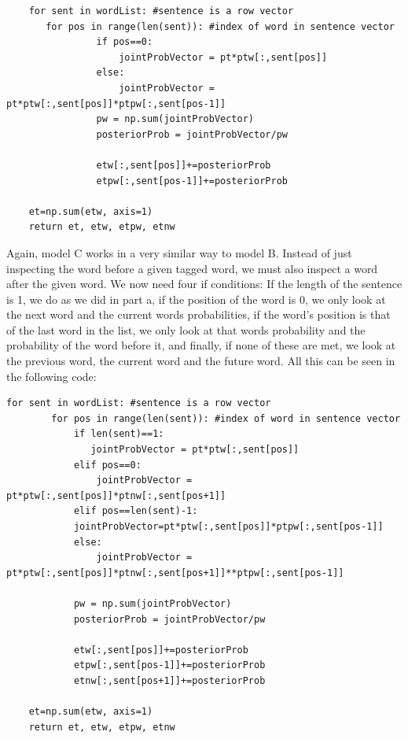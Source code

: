 \documentclass{article}
\begin{document}
\begin{verbatim}     
   	for sent in wordList: #sentence is a row vector
	   for pos in range(len(sent)): #index of word in sentence vector   
                if pos==0:
                    jointProbVector = pt*ptw[:,sent[pos]] 
                else:
                    jointProbVector = pt*ptw[:,sent[pos]]*ptpw[:,sent[pos-1]]                
                pw = np.sum(jointProbVector)
                posteriorProb = jointProbVector/pw
                
                etw[:,sent[pos]]+=posteriorProb
                etpw[:,sent[pos-1]]+=posteriorProb

	et=np.sum(etw, axis=1)	
	return et, etw, etpw, etnw
\end{verbatim}

Again, model C works in a very similar way to model B. Instead of just inspecting the word before a given tagged word, we must also inspect a word after the given word.  We now need four if conditions:  If the length of the sentence is 1, we do as we did in part a, if the position of the word is 0, we only look at the next word and the current words probabilities, if the word's position is that of the last word in the list, we only look at that words probability and the probability of the word before it, and finally, if none of these are met, we look at the previous word, the current word and the future word.  All this can be seen in the following code:  \begin{verbatim}
for sent in wordList: #sentence is a row vector
        for pos in range(len(sent)): #index of word in sentence vector   
            if len(sent)==1:
               jointProbVector = pt*ptw[:,sent[pos]]                                         
            elif pos==0:
                jointProbVector = pt*ptw[:,sent[pos]]*ptnw[:,sent[pos+1]]    
            elif pos==len(sent)-1:
           	jointProbVector=pt*ptw[:,sent[pos]]*ptpw[:,sent[pos-1]] 
            else:
                jointProbVector = pt*ptw[:,sent[pos]]*ptnw[:,sent[pos+1]]**ptpw[:,sent[pos-1]]
            
            pw = np.sum(jointProbVector)
            posteriorProb = jointProbVector/pw
            
            etw[:,sent[pos]]+=posteriorProb
            etpw[:,sent[pos-1]]+=posteriorProb
            etnw[:,sent[pos+1]]+=posteriorProb
                        
    et=np.sum(etw, axis=1)	
    return et, etw, etpw, etnw 
\end{verbatim} 
\end{document}

